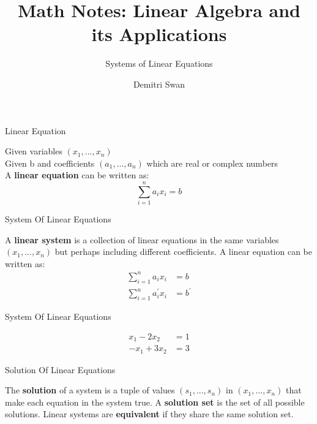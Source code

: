 \documentclass{beamer}
\title{Math Notes: Linear Algebra and its Applications}
\subtitle[short subtitle]{Systems of Linear Equations}
\author{Demitri Swan}
\date{}
\begin{document}
\begin{frame}
  \titlepage %
\end{frame}

\begin{frame}{Linear Equation}
\begin{definition}
Given variables $\left(x_{1}, ... , x_{n}\right)$\\
Given b and coefficients $\left(a_{1}, ... ,a_{n}\right)$ which are real or complex numbers\\
A \textbf{linear equation} can be written as:\\
\[ \sum_{i=1}^{n} a_{i}x_{i} = b \]
\end{definition}
\end{frame}

\begin{frame}{System Of Linear Equations}
\begin{definition}
A \textbf{linear system} is a collection of linear equations in the same variables $\left(x_{1}, ... ,x_{n}\right)$ 
but perhaps including different coefficients. A linear equation can be written as:\\
\begin{align*}
\sum_{i=1}^{n} a_{i}x_{i} &= b \\
\sum_{i=1}^{n} a^{\prime}_{i}x_{i} &= b^{\prime}
\end{align*}
\end{definition}
\end{frame}

\begin{frame}{System Of Linear Equations}
\begin{example}
\begin{align*}
x_{1} - 2x_{2} &= 1\\
-x_{1} + 3x_{2} &= 3
\end{align*}
\end{example}
\end{frame}

\begin{frame}{Solution Of Linear Equations}
\begin{definition}
The \textbf{solution} of a system is a tuple of values $\left(s_{1}, ... , s_{n}\right)$ in $\left(x_{1}, ... ,x_{n}\right)$ 
that make each equation in the system true. A \textbf{solution set} is the set of all possible solutions. 
Linear systems are \textbf{equivalent} if they share the same solution set.
\end{definition}
\end{frame}
\end{document}
